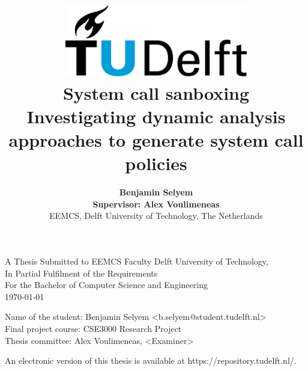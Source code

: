 \title{
    \includegraphics[width=8cm, keepaspectratio]{tudelftlogo.png}\\
    \vspace*{2cm}
    \textbf{
        System call sanboxing\\
        {\large Investigating dynamic analysis approaches to generate system call policies}
    }\\
    \vspace*{1cm}
}

\author{
    \textbf{
Benjamin Selyem}\\
    \hfill \break
    \textbf{Supervisor: Alex Voulimeneas}\\
    \break
    {\large 
        \hfill \break
        EEMCS, Delft University of Technology, The Netherlands
    }\\
}

\date{}

\maketitle
\thispagestyle{empty}

\let\clearpagebackup\clearpage
\renewcommand{\clearpage}{ }

\onecolumn

\vspace*{1.5cm}
\begin{center}
    A Thesis Submitted to EEMCS Faculty Delft University of Technology,\\
    In Partial Fulfilment of the Requirements\\
    For the Bachelor of Computer Science and Engineering\\
    \today
\end{center}

\vspace*{2cm}

\noindent
{\small
Name of the student: Benjamin Selyem \textless b.selyem@student.tudelft.nl\textgreater\\
Final project course: CSE3000 Research Project\\
Thesis committee: Alex Voulimeneas, \textless Examiner\textgreater\\ %
}
\vfill

\begin{center}
    An electronic version of this thesis is available at https://repository.tudelft.nl/.
\end{center}

\twocolumn
\let\clearpage\clearpagebackup  
\clearpage
\setcounter{page}{1}
